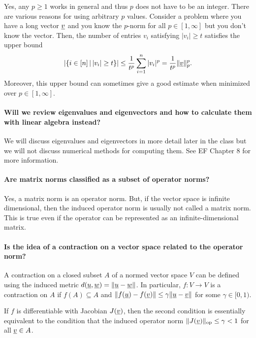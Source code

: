 \documentclass[10pt,english]{article}
\begin{document}
Yes, any $p\geq 1$ works in general and thus $p$ does not have to be an integer.
There are various reasons for using arbitrary $p$ values.
Consider a problem where you have a long vector $\underline{v}$ and you know the $p$-norm for all $p\in [1,\infty]$ but you don't know the vector.
Then, the number of entries $v_i$ satisfying $|v_i| \geq t$ satisfies the upper bound $$\left| \{i\in [n]\,|\, |v_i|\geq t \} \right| \leq \frac{1}{t^p} \sum_{i=1}^n |v_i|^p = \frac{1}{t^p} \| \underline{v} \|_p^p . $$
Moreover, this upper bound can sometimes give a good estimate when minimized over $p\in [1,\infty]$.

\paragraph{Will we review eigenvalues and eigenvectors and how to calculate them with linear algebra instead?}

We will discuss eigenvalues and eigenvectors in more detail later in the class but we will not discuss numerical methods for computing them.
See EF Chapter 8 for more information.

\paragraph{Are matrix norms classified as a subset of operator norms?}
Yes, a matrix norm is an operator norm.
But, if the vector space is infinite dimensional, then the induced operator norm is usually not called a matrix norm.
This is true even if the operator can be represented as an infinite-dimensional matrix.

\paragraph{Is the idea of a contraction on a vector space related to the operator norm?}

A contraction on a closed subset $A$ of a normed vector space $V$ can be defined using the induced metric $d(\underline{u},\underline{w}) = \| \underline{u} - \underline{w} \|$.
In particular, $f \colon V \to V$ is a contraction on $A$ if $f(A) \subseteq A$ and $\| f(\underline{u}) - f(\underline{v}) \| \leq \gamma \| \underline{u} - \underline{v} \|$ for some $\gamma \in [0,1)$.

If $f$ is differentiable with Jacobian $J(\underline{v})$, then the second condition is essentially equivalent to the condition that the induced operator norm $\|J(\underline{v}) \|_{\mathrm{op}} \leq \gamma < 1$ for all $\underline{v} \in A$.
\end{document}
